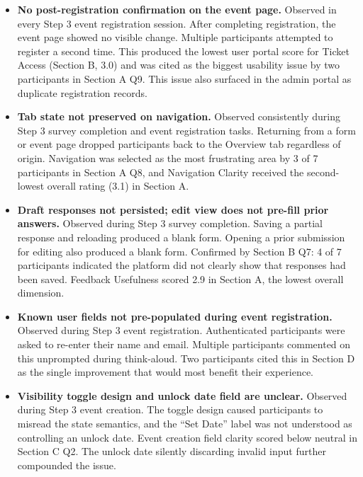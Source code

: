 \documentclass[12pt]{article}
\begin{document}
\begin{itemize}
    \item \textbf{No post-registration confirmation on the event page.} Observed in every Step 3 event registration session. After completing registration, the event page showed no visible change. Multiple participants attempted to register a second time. This produced the lowest user portal score for Ticket Access (Section B, 3.0) and was cited as the biggest usability issue by two participants in Section A Q9. This issue also surfaced in the admin portal as duplicate registration records.

    \item \textbf{Tab state not preserved on navigation.} Observed consistently during Step 3 survey completion and event registration tasks. Returning from a form or event page dropped participants back to the Overview tab regardless of origin. Navigation was selected as the most frustrating area by 3 of 7 participants in Section A Q8, and Navigation Clarity received the second-lowest overall rating (3.1) in Section A.

    \item \textbf{Draft responses not persisted; edit view does not pre-fill prior answers.} Observed during Step 3 survey completion. Saving a partial response and reloading produced a blank form. Opening a prior submission for editing also produced a blank form. Confirmed by Section B Q7: 4 of 7 participants indicated the platform did not clearly show that responses had been saved. Feedback Usefulness scored 2.9 in Section A, the lowest overall dimension.

    \item \textbf{Known user fields not pre-populated during event registration.} Observed during Step 3 event registration. Authenticated participants were asked to re-enter their name and email. Multiple participants commented on this unprompted during think-aloud. Two participants cited this in Section D as the single improvement that would most benefit their experience.

    \item \textbf{Visibility toggle design and unlock date field are unclear.} Observed during Step 3 event creation. The toggle design caused participants to misread the state semantics, and the ``Set Date'' label was not understood as controlling an unlock date. Event creation field clarity scored below neutral in Section C Q2. The unlock date silently discarding invalid input further compounded the issue.


\end{itemize}
\end{document}
